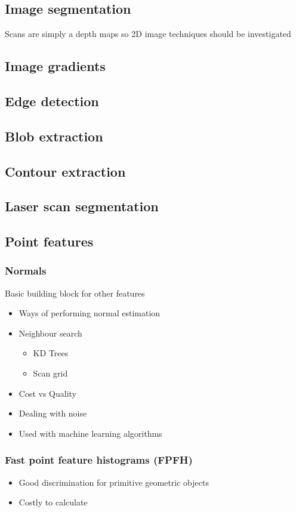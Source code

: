 \subsection{Image segmentation}
	Scans are simply a depth maps so 2D image techniques should be investigated
	\subsection{Image gradients}
	\subsection{Edge detection}
	\subsection{Blob extraction}
	\subsection{Contour extraction}

\subsection{Laser scan segmentation}
	\subsection{Point features}
		\subsubsection{Normals}
			Basic building block for other features
			\begin{itemize}
			\item Ways of performing normal estimation
			\item Neighbour search
				\begin{itemize}
				\item KD Trees
				\item Scan grid
				\end{itemize}
			\item Cost vs Quality
			\item Dealing with noise
			\item Used with machine learning algorithms
			\end{itemize}
				
		\subsubsection{Fast point feature histograms (FPFH)}
			\begin{itemize}
			\item Good discrimination for primitive geometric objects
			\item Costly to calculate
			\end{itemize}
			
